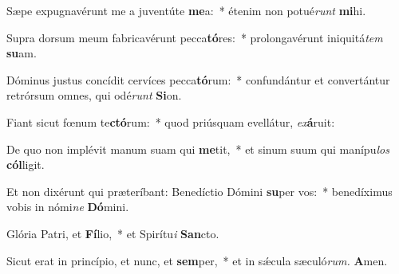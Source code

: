 \item Sæpe expugnavérunt me a juventúte \textbf{me}a:~* étenim non potué\hspace*{0.02em}\textit{runt} \textbf{mi}hi.
\item Supra dorsum meum fabricavérunt pecca\textbf{tó}res:~* prolongavérunt iniquitá\hspace{0.03em}\textit{tem} \textbf{su}am.
\item Dóminus justus concídit cervíces pecca\textbf{tó}rum:~* confundántur et convertántur retrórsum omnes, qui odé\hspace{0.03em}\textit{runt} \textbf{Si}on.
\item Fiant sicut fœnum te\textbf{ctó}rum:~* quod priúsquam evellátur, \textit{ex}\textbf{á}ruit:
\item De quo non implévit manum suam qui \textbf{me}tit,~* et sinum suum qui manípu\hspace{0.03em}\textit{los} \textbf{cól}ligit.
\item Et non dixérunt qui præteríbant: Benedíctio Dómini \textbf{su}per vos:~* benedíximus vobis in nómi\textit{ne} \textbf{Dó}mini.
\item Glória Patri, et \textbf{Fí}lio,~* et Spirítu\hspace{0.03em}\textit{i} \textbf{San}cto.
\item Sicut erat in princípio, et nunc, et \textbf{sem}per,~* et in sǽcula sæculó\textit{rum.} \textbf{A}men.